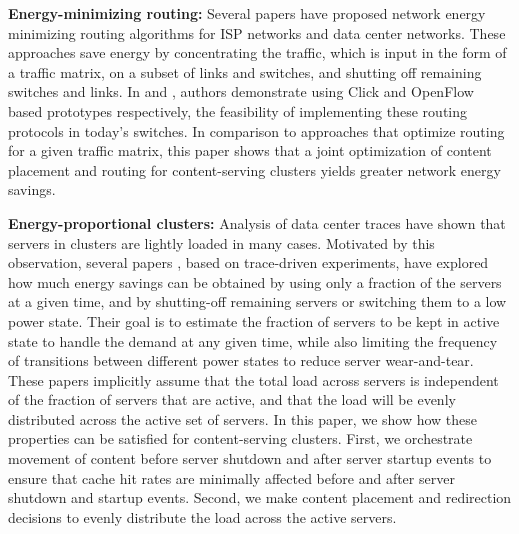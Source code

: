 \textbf{Energy-minimizing routing:} Several papers  \cite{response, elasticTree, greenTE, Chiaraviglio, Andrews} have proposed network energy minimizing routing algorithms for ISP networks and data center networks.   These approaches save energy by  concentrating the traffic, which is input in the form of a traffic matrix, on a subset of links and switches, and shutting off remaining switches and links. In \cite{response} and \cite{elasticTree}, authors demonstrate using Click and OpenFlow based prototypes respectively, the feasibility of implementing these routing protocols in today's switches. In comparison to approaches that optimize routing for a given traffic matrix, this paper shows that a joint optimization of content placement and routing for content-serving clusters yields greater network energy savings.


\textbf{Energy-proportional clusters:} Analysis of data center traces have shown that servers in clusters are  lightly loaded in many cases. Motivated by this observation, several papers \cite{mathew12,JainEnergy,lin12,lu13}, based on trace-driven experiments,  have explored how much energy savings can be obtained by using only a fraction of the servers at a given time, and by shutting-off remaining servers or switching them to a low power state. Their goal is to estimate  the fraction of servers to be kept in active state to handle the demand at any given time, while also limiting the frequency of transitions between different power states to reduce server wear-and-tear. These papers implicitly assume that the total load across servers is independent of the fraction of servers that are active,  and that the load will be evenly distributed across the active set of servers. In this paper, we show how these properties can be satisfied for content-serving clusters. First,  we orchestrate movement of content before server shutdown and after server startup events to ensure that cache hit rates are minimally affected before and after server shutdown and startup events. Second, we make content placement and redirection decisions to evenly distribute the load across the active servers.  

